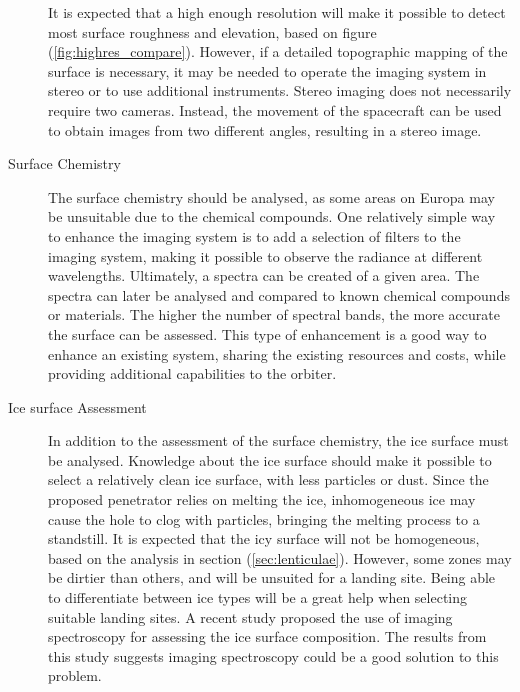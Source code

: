\begin{description}
It is expected that a high enough resolution will make it possible to detect most surface roughness and elevation, based on figure (\ref{fig:highres_compare}). However, if a detailed topographic mapping of the surface is necessary, it may be needed to operate the imaging system in stereo or to use additional instruments. Stereo imaging does not necessarily require two cameras. Instead, the movement of the spacecraft can be used to obtain images from two different angles, resulting in a stereo image. 
\item[Surface Chemistry]
The surface chemistry should be analysed, as some areas on Europa may be unsuitable due to the chemical compounds. One relatively simple way to enhance the imaging system is to add a selection of filters to the imaging system, making it possible to observe the radiance at different wavelengths. Ultimately, a spectra can be created of a given area. The spectra can later be analysed and compared to known chemical compounds or materials. The higher the number of spectral bands, the more accurate the surface can be assessed. This type of enhancement is a good way to enhance an existing system, sharing the existing resources and costs, while providing additional capabilities to the orbiter.
\item[Ice surface Assessment]
In addition to the assessment of the surface chemistry, the ice surface must be analysed. Knowledge about the ice surface should make it possible to select a relatively clean ice surface, with less particles or dust. Since the proposed penetrator relies on melting the ice, inhomogeneous ice may cause the hole to clog with particles, bringing the melting process to a standstill. It is expected that the icy surface will not be homogeneous, based on the analysis in section (\ref{sec:lenticulae}). However, some zones may be dirtier than others, and will be unsuited for a landing site. Being able to differentiate between ice types will be a great help when selecting suitable landing sites. A recent study \cite{naegeli2015a} proposed the use of imaging spectroscopy for assessing the ice surface composition. The results from this study suggests imaging spectroscopy could be a good solution to this problem.
\end{description}
